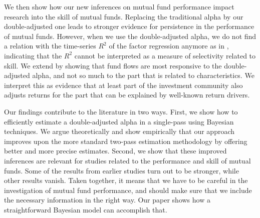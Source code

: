 We then show how our new inferences on mutual fund performance impact research into the skill of mutual funds. Replacing the traditional alpha by our double-adjusted one leads to stronger evidence for persistence in the performance of mutual funds. However, when we use the double-adjusted alpha, we do not find a relation with the time-series $R^2$ of the factor regression anymore as in \citet{amihud2013mutual}, indicating that the $R^2$ cannot be interpreted as a measure of selectivity related to skill. We extend \citet{barber2016factors} by showing that fund flows are most responsive to the double-adjusted alpha, and not so much to the part that is related to characteristics. We interpret this as evidence that at least part of the investment community also adjusts returns for the part that can be explained by well-known return drivers.

Our findings contribute to the literature in two ways. First, we show how to efficiently estimate a double-adjusted alpha in a single-pass using Bayesian techniques. We argue theoretically and show empirically that our approach improves upon the more standard two-pass estimation methodology by offering better and more precise estimates. Second, we show that these improved inferences are relevant for studies related to the performance and skill of mutual funds. Some of the results from earlier studies turn out to be stronger, while other results vanish. Taken together, it means that we have to be careful in the investigation of mutual fund performance, and should make sure that we include the necessary information in the right way. Our paper shows how a straightforward Bayesian model can accomplish that.

